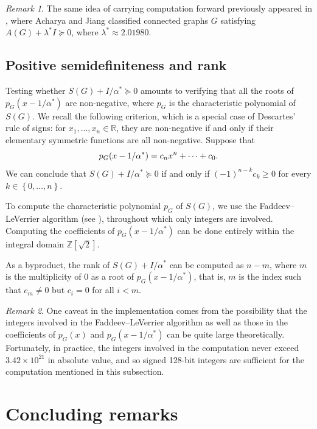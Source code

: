 \documentclass[11pt]{article}
\theoremstyle{definition}
\theoremstyle{remark}
\newtheorem*{remark}{Remark}
\newcommand{\sset}[1]{\left\{{#1}\right\}}
\newcommand{\R}{\mathbb{R}}
\newcommand{\rtwo}{\alpha^*}
\begin{document}
\begin{remark}
    The same idea of carrying computation forward previously appeared in \cite{AJ25}, where Acharya and Jiang classified connected graphs $G$ satisfying $A(G) + \lambda^* I \succeq 0$, where $\lambda^* \approx 2.01980$.
\end{remark}

\subsection{Positive semidefiniteness and rank}

Testing whether $S(G) + I/\rtwo \succeq 0$ amounts to verifying that all the roots of $p_G(x - 1/\rtwo)$ are non-negative, where $p_G$ is the characteristic polynomial of $S(G)$. We recall the following criterion, which is a special case of Descartes' rule of signs: for $x_1, \dots, x_n \in \R$, they are non-negative if and only if their elementary symmetric functions are all non-negative. Suppose that
\[
    p_G\mleft(x - 1/\rtwo\mright) = c_nx^n + \dots + c_0.
\]
We can conclude that $S(G) + I/\rtwo \succeq 0$ if and only if $(-1)^{n-k}c_k \ge 0$ for every $k \in \sset{0, \dots, n}$.

To compute the characteristic polynomial $p_G$ of $S(G)$, we use the Faddeev--LeVerrier algorithm (see \cite[Chapter IV Section 5]{G98}), throughout which only integers are involved. Computing the coefficients of $p_G(x - 1/\rtwo)$ can be done entirely within the integral domain $\mathbb{Z}[\sqrt2]$.

As a byproduct, the rank of $S(G) + I/\rtwo$ can be computed as $n - m$, where $m$ is the multiplicity of $0$ as a root of $p_G(x - 1/\rtwo)$, that is, $m$ is the index such that $c_m \neq 0$ but $c_i = 0$ for all $i < m$.

\begin{remark}
    One caveat in the implementation comes from the possibility that the integers involved in the Faddeev--LeVerrier algorithm as well as those in the coefficients of $p_G(x)$ and $p_G(x - 1/\rtwo)$ can be quite large theoretically. Fortunately, in practice, the integers involved in the computation never exceed $3.42 \times 10^{21}$ in absolute value, and so signed 128-bit integers are sufficient for the computation mentioned in this subsection.
\end{remark}

\section{Concluding remarks} \label{sec:open}
\end{document}
